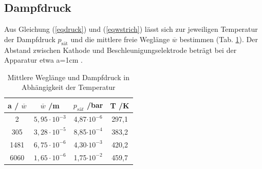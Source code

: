 %
\subsection{Dampfdruck}
Aus Gleichung (\ref{eqdruck}) und (\ref{eqwstrich}) lässt sich zur jeweiligen Temperatur
der Dampfdruck $p_{\text{sät}}$ und die mittlere freie Weglänge $\overline w$ bestimmen 
(Tab. \ref{tabbasis}). Der Abstand zwischen Kathode und Beschleunigungselektrode beträgt 
bei der Apparatur etwa a=1cm \cite{anleitung}. 

\begin{table}[h]
\begin{center}
\begin{tabular}[c]{cccc} 
a / $\overline w$&$\overline w$ /m & $p_{sät}$ /bar & T /K\\ \hline
2&$ 5,95\cdot 10^{-3}$ &  4,87$\cdot 10^{-6}$& 297,1\\ 
305&$ 3,28\cdot 10^{-5}$ &  8,85$\cdot 10^{-4}$& 383,2\\
1481&$ 6,75\cdot 10^{-6}$ &  4,30$\cdot 10^{-3}$& 420,2\\ 
6060&$ 1,65\cdot 10^{-6}$ &  1,75$\cdot 10^{-2}$& 459,7 
\end{tabular}
\caption{Mittlere Weglänge und Dampfdruck in Abhängigkeit der Temperatur}
\label{tabbasis}
\end{center}
\end{table}


